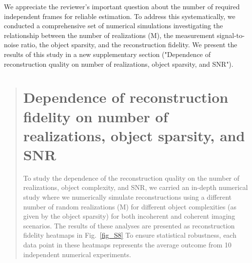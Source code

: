 \documentclass[12pt]{article}
\newenvironment{finished_ourresponse}
    {\begin{tcolorbox}[width=\linewidth,breakable,enhanced,colback=gray!5,colframe=finished_responsecolor!50,title=Response,left=5pt,right=5pt]}
    {\end{tcolorbox}}
\begin{document}
\begin{finished_ourresponse}
    We appreciate the reviewer's important question about the number of required independent frames for reliable estimation. To address this systematically, we conducted a comprehensive set of numerical simulations investigating the relationship between the number of realizations (M), the measurement signal-to-noise ratio, the object sparsity, and the reconstruction fidelity. We present the results of this study in a new supplementary section ("Dependence of reconstruction quality on number of realizations, object sparsity, and SNR").

    \begin{quote}
        \setcounter{section}{2221}
        \section{Dependence of reconstruction fidelity on number of realizations, object sparsity, and SNR}

        To study the dependence of the reconstruction quality on the number of realizations, object complexity, and SNR, we carried an in-depth numerical study where we numerically simulate reconstructions using a different number of random realizations (M) for different object complexities (as given by the object sparsity) for both incoherent and coherent imaging scenarios.
        The results of these analyses are presented as reconstruction fidelity heatmaps in Fig.~\ref{fig_S8}
        To ensure statistical robustness, each data point in these heatmaps represents the average outcome from 10 independent numerical experiments.


\end{quote}
\end{finished_ourresponse}
\end{document}
